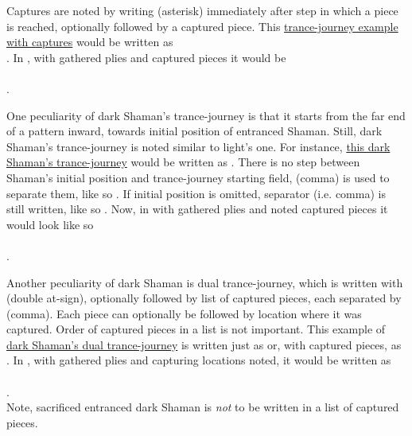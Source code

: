 Captures are noted by writing \alg{*} (asterisk) immediately after step in which a piece
is reached, optionally followed by a captured piece. This
\hyperref[fig:scn_cot_21_dark_light_shaman_interaction_end]{trance-journey example with captures}
would be written as \\
. In , with gathered plies and
captured pieces it would be \\
\\
\alg{[He13..e18*N..m12*P..g24]}.

One peculiarity of dark Shaman's trance-journey is that it starts from the far end of a
pattern inward, towards initial position of entranced Shaman. Still, dark Shaman's
trance-journey is noted similar to light's one. For instance,
\hyperref[fig:scn_cot_22_dark_dark_shaman_interaction_start]{this dark Shaman's trance-journey}
would be written as .
There is no step between Shaman's initial position and trance-journey starting field,
\alg{,} (comma) is used to separate them, like so .
If initial position is omitted, separator (i.e. comma) is still written, like so
. Now, in  with gathered plies and noted
captured pieces it would look like so\\
\\
\alg{[He12,w18..q16*P..k14*N..c18]}.

Another peculiarity of dark Shaman is dual trance-journey, which is written with 
(double at-sign), optionally followed by list of captured pieces, each separated by \alg{,}
(comma). Each piece can optionally be followed by location where it was captured. Order of
captured pieces in a list is not important. This example of
\hyperref[fig:scn_cot_24_dark_dark_shaman_double_interaction_start]{dark Shaman's dual trance-journey}
is written just as  or, with captured pieces, as
. In , with gathered plies and capturing
locations noted, it would be written as \\
\\
.\\
Note, sacrificed entranced dark Shaman is \emph{not} to be written in a list of captured
pieces.


